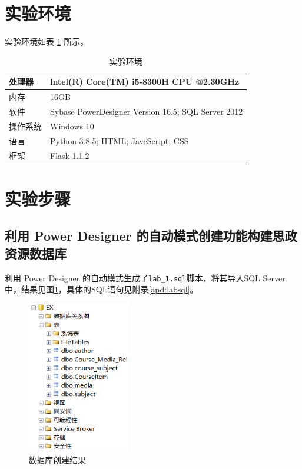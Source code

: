 \documentclass[11pt]{article}
\begin{document}
  \section{实验环境}
  实验环境如表 \ref{tab:env} 所示。
  \begin{table}[h]
    \centering
    \caption{实验环境}
    \label{tab:env}
    \begin{tabular}{ll}
      \hline
      处理器 & lntel(R) Core(TM) i5-8300H CPU @2.30GHz \\
      \hline
      内存 & 16GB \\
      \hline
      软件 & Sybase PowerDesigner Version 16.5; SQL Server 2012\\
      \hline
      操作系统 & Windows 10 \\
      \hline
      语言 & Python 3.8.5; HTML; JaveScript; CSS\\
      \hline
      框架 & Flask 1.1.2 \\
      \hline
      
    \end{tabular}
  \end{table}

  \section{实验步骤}
  \subsection{利用 Power Designer 的自动模式创建功能构建思政资源数据库}

  利用 Power Designer 的自动模式生成了\verb|lab_1.sql|脚本，将其导入SQL Server中，结果见图\ref{fig:powerdesignerResult}，具体的SQL语句见附录\ref{apd:labsql}。
  \begin{figure}[h]
    \centering
    \includegraphics[width=0.4\textwidth]{PDResult.png}
    \caption{数据库创建结果}
    \label{fig:powerdesignerResult}
  \end{figure}
\end{document}
